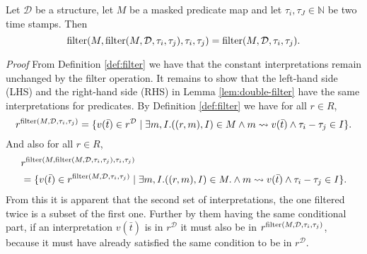 \begin{lemma}
    \label{lem:double-filter}
    Let $\mathcal{D}$ be a structure, let $M$ be a masked predicate map and let $\tau_i, \tau_J \in \mathbb{N}$ be two time stamps.
    Then 
    \begin{equation*}
        \operatorname{filter}(M, \operatorname{filter}(M, \mathcal{D}, \tau_i, \tau_j), \tau_i, \tau_j) = \operatorname{filter}(M, \mathcal{D}, \tau_i, \tau_j).
    \end{equation*}
\end{lemma}
\textit{Proof} From Definition \ref{def:filter} we have that the constant interpretations remain unchanged by the filter operation.
It remains to show that the left-hand side (LHS) and the right-hand side (RHS) in Lemma \ref{lem:double-filter} have the same interpretations for predicates.
By Definition \ref{def:filter} we have 
for all $r \in R$,
\begin{equation*}
    r^{\operatorname{filter}(M, \mathcal{D}, \tau_i, \tau_j)} 
    = \{v(\bar{t}) \in r^{\mathcal{D}} \mid 
        \exists m,I.
            ((r,m), I) \in M
            \land m \rightsquigarrow v(\bar{t}) 
            \land \tau_i - \tau_j \in I \}.
\end{equation*}
And also for all $r \in R$,
\begin{align*}
    &r^{\operatorname{filter}(M, \operatorname{filter}(M, \mathcal{D}, \tau_i, \tau_j), \tau_i, \tau_j)} \\
    &= \{v(\bar{t}) \in r^{\operatorname{filter}(M, \mathcal{D}, \tau_i, \tau_j)} \mid 
        \exists m,I.
            ((r,m), I) \in M. 
            \land m \rightsquigarrow v(\bar{t}) 
            \land \tau_i - \tau_j \in I \}.
\end{align*}
From this it is apparent that the second set of interpretations, the one filtered twice is a subset of the first one.
Further by them having the same conditional part, if an interpretation $v(\bar{t})$ is in $r^{\mathcal{D}}$ it must also be in $r^{\operatorname{filter}(M, \mathcal{D}, \tau_i, \tau_j)}$, because it must have already satisfied the same condition to be in $r^{\mathcal{D}}$.